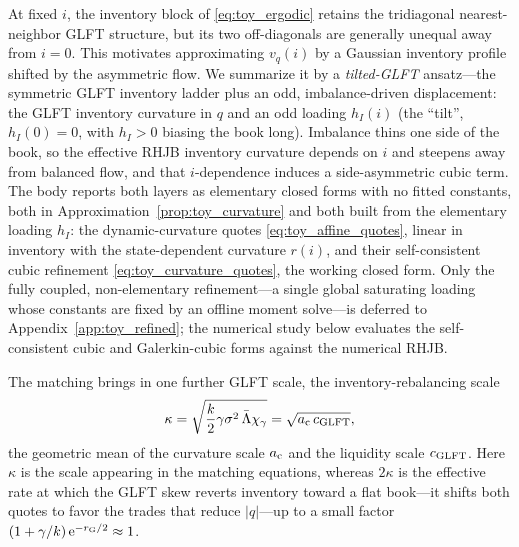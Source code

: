 \documentclass[11pt,a4paper]{article}
\newcommand{\e}{\mathrm e}
\theoremstyle{plain}
\theoremstyle{definition}
\begin{document}
At fixed \(i\), the inventory block of \eqref{eq:toy_ergodic} retains the
tridiagonal nearest-neighbor GLFT structure, but its two off-diagonals are
generally unequal away from \(i=0\).  This motivates approximating
\(v_q(i)\) by a Gaussian inventory profile shifted by the asymmetric flow.
We summarize it by a
\emph{tilted-GLFT} ansatz---the symmetric GLFT inventory ladder plus an odd,
imbalance-driven displacement: the GLFT inventory curvature in \(q\) and an odd
loading \(h_I(i)\) (the ``tilt'', \(h_I(0)=0\), with \(h_I>0\) biasing the book
long).  Imbalance thins one side of the book, so the effective RHJB inventory curvature depends
on \(i\) and steepens away from balanced flow, and that \(i\)-dependence induces
a side-asymmetric cubic term.  The body reports both layers as elementary
closed forms with no fitted constants, both in Approximation~\ref{prop:toy_curvature}
and both built from the elementary loading \(h_I\): the dynamic-curvature quotes
\eqref{eq:toy_affine_quotes}, linear in inventory with the state-dependent
curvature \(r(i)\), and their self-consistent cubic refinement
\eqref{eq:toy_curvature_quotes}, the working closed form.  Only the fully coupled, non-elementary refinement---a single global
saturating loading whose constants are fixed by an offline moment solve---is
deferred to Appendix~\ref{app:toy_refined}; the numerical study below evaluates
the self-consistent cubic and Galerkin-cubic forms against the numerical RHJB.

The matching brings in one further GLFT scale, the inventory-rebalancing scale
\begin{equation}
\kappa
=
\sqrt{\frac{k}{2}\gamma\sigma^2\,\bar\Lambda\chi_\gamma}
=\sqrt{a_{\rm c}\,c_{\rm GLFT}},
\label{eq:toy_glft_scales}
\end{equation}
the geometric mean of the curvature scale \(a_{\rm c}\) and the liquidity scale
\(c_{\rm GLFT}\).  Here \(\kappa\) is the scale appearing in the matching
equations, whereas \(2\kappa\) is the effective rate at which the GLFT skew reverts inventory
toward a flat book---it shifts both quotes to favor the trades that reduce
\(|q|\)---up to a small factor \((1+\gamma/k)\,\e^{-r_{\rm G}/2}\approx1\).
\end{document}
